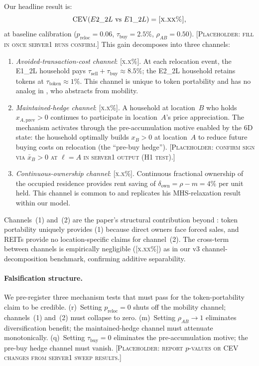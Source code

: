 Our headline result is:
\begin{equation}
    \operatorname{CEV}(E2\_2L \text{ vs } E1\_2L) = \textsc{[x.xx\%]},
    \label{eq:headline_cev}
\end{equation}
at baseline calibration ($p_{\text{reloc}} = 0.06$, $\tau_{\text{buy}} = 2.5\%$,
$\rho_{AB} = 0.50$).
[\textsc{Placeholder: fill in once server1 runs confirm.}]
This gain decomposes into three channels:
\begin{enumerate}
    \item \emph{Avoided-transaction-cost channel}: \textsc{[x.x\%]}.
        At each relocation event, the E1\_2L household pays
        $\tau_{\text{sell}} + \tau_{\text{buy}} \approx 8.5\%$;
        the E2\_2L household retains tokens at $\tau_{\text{token}} \approx 1\%$.
        This channel is unique to token portability and has no analog in
        \citet{Liu2021}, who abstracts from mobility.

    \item \emph{Maintained-hedge channel}: \textsc{[x.x\%]}.
        A household at location~$B$ who holds $x_{A,\text{prev}} > 0$ continues
        to participate in location~$A$'s price appreciation.
        The mechanism activates through the pre-accumulation motive enabled by
        the 6D state: the household optimally builds $x_B > 0$ at location~$A$
        to reduce future buying costs on relocation (the ``pre-buy hedge'').
        [\textsc{Placeholder: confirm sign via $\bar{x}_B > 0$ at $\ell = A$
        in server1 output (H1 test).}]

    \item \emph{Continuous-ownership channel}: \textsc{[x.x\%]}.
        Continuous fractional ownership of the occupied residence provides
        rent saving of $\delta_{\text{own}} = \rho - m = 4\%$ per unit held.
        This channel is common to \citet{Liu2021} and replicates his
        MHS-relaxation result within our model.
\end{enumerate}
Channels~(1) and~(2) are the paper's structural contribution beyond
\citet{Liu2021}: token portability uniquely provides (1) because direct
owners face forced sales, and REITs provide no location-specific claims
for channel~(2).
The cross-term between channels is empirically negligible (\textsc{[x.xx\%]})
as in our v3 channel-decomposition benchmark, confirming additive separability.

\paragraph{Falsification structure.}
We pre-register three mechanism tests that must pass for the token-portability
claim to be credible.
(r)~Setting $p_{\text{reloc}} = 0$ shuts off the mobility channel;
    channels~(1) and~(2) must collapse to zero.
(m)~Setting $\rho_{AB} \to 1$ eliminates diversification benefit;
    the maintained-hedge channel must attenuate monotonically.
(q)~Setting $\tau_{\text{buy}} = 0$ eliminates the pre-accumulation motive;
    the pre-buy hedge channel must vanish.
[\textsc{Placeholder: report $p$-values or CEV changes from server1 sweep results.}]

